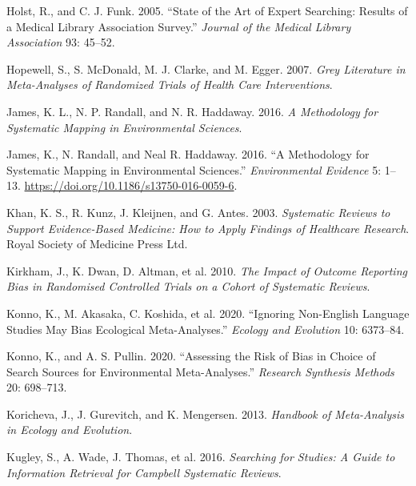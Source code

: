 \documentclass[
  letterpaper,
  DIV=11,
  numbers=noendperiod]{scrreprt}
\newcounter{none} %
\newlength{\cslhangindent}
\newenvironment{CSLReferences}[2] %
 {\begin{list}{}{%
  \setlength{\itemindent}{0pt}
  \setlength{\leftmargin}{0pt}
  \setlength{\parsep}{0pt}
  \ifodd #1
   \setlength{\leftmargin}{\cslhangindent}
   \setlength{\itemindent}{-1\cslhangindent}
  \fi
  \setlength{\itemsep}{#2\baselineskip}}}
 {\end{list}}
\begin{document}
\begin{CSLReferences}{1}{1}
Holst, R., and C. J. Funk. 2005. {``State of the Art of Expert
Searching: Results of a Medical Library Association Survey.''}
\emph{Journal of the Medical Library Association} 93: 45--52.

Hopewell, S., S. McDonald, M. J. Clarke, and M. Egger. 2007. \emph{Grey
Literature in Meta-Analyses of Randomized Trials of Health Care
Interventions}.

James, K. L., N. P. Randall, and N. R. Haddaway. 2016. \emph{A
Methodology for Systematic Mapping in Environmental Sciences}.

James, K., N. Randall, and Neal R. Haddaway. 2016. {``A Methodology for
Systematic Mapping in Environmental Sciences.''} \emph{Environmental
Evidence} 5: 1--13. \url{https://doi.org/10.1186/s13750-016-0059-6}.

Khan, K. S., R. Kunz, J. Kleijnen, and G. Antes. 2003. \emph{Systematic
Reviews to Support Evidence-Based Medicine: How to Apply Findings of
Healthcare Research}. Royal Society of Medicine Press Ltd.

{Kirkham, J., K. Dwan, D. Altman, et al.} 2010. \emph{The Impact of
Outcome Reporting Bias in Randomised Controlled Trials on a Cohort of
Systematic Reviews}.

Konno, K., M. Akasaka, C. Koshida, et al. 2020. {``Ignoring Non-English
Language Studies May Bias Ecological Meta-Analyses.''} \emph{Ecology and
Evolution} 10: 6373--84.

Konno, K., and A. S. Pullin. 2020. {``Assessing the Risk of Bias in
Choice of Search Sources for Environmental Meta-Analyses.''}
\emph{Research Synthesis Methods} 20: 698--713.

Koricheva, J., J. Gurevitch, and K. Mengersen. 2013. \emph{Handbook of
Meta-Analysis in Ecology and Evolution}.

Kugley, S., A. Wade, J. Thomas, et al. 2016. \emph{Searching for
Studies: A Guide to Information Retrieval for Campbell Systematic
Reviews}.


\end{CSLReferences}
\end{document}
